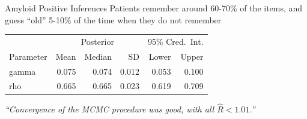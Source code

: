 \documentclass[10pt]{beamer}
\begin{document}
\begin{frame}[fragile]{Amyloid Positive Inferences}
	Patients remember around {\color{red}60-70\%} of the items, and guess ``old'' {\color{darkgreen}5-10\%} of the time when they do not remember

	\begin{table}[h]
		\centering
		\begin{tabular}{lrrrrr}
			\toprule
			\multicolumn{1}{c}{} & \multicolumn{3}{c}{Posterior} & \multicolumn{2}{c}{95\% Cred.\ Int.}                                                               \\
			\cline{2-4}\cline{5-6}
			Parameter            & Mean                          & Median                               & SD    & Lower                    & Upper                    \\
			\cmidrule[0.4pt]{1-6}
			gamma                & 0.075                         & 0.074                                & 0.012 & {\color{darkgreen}0.053} & {\color{darkgreen}0.100} \\
			rho                  & 0.665                         & 0.665                                & 0.023 & {\color{red}      0.619} & {\color{red}      0.709} \\
			\bottomrule
		\end{tabular}
	\end{table}\pause

	\textit{``Convergence of the MCMC procedure was good, with all $\hat{R} < 1.01$.''}

\end{frame}
\end{document}
